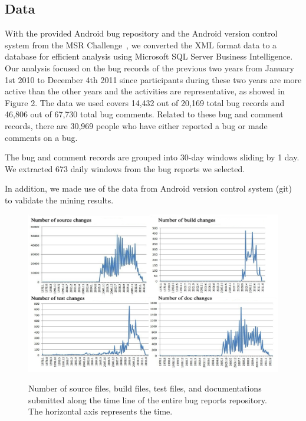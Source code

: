 \documentclass[10pt, conference, compsocconf]{IEEEtran}
\begin{document}
\subsection{Data}

With the provided Android bug repository and the Android version
control system
from the MSR Challenge~\cite{DATA:msr}, we converted the XML format data to
a database for efficient analysis using Microsoft SQL Server Business
Intelligence. Our analysis focused on the bug records of the previous
two years from January 1st 2010 to December 4th 2011 since participants
during these two years are more active than the other years and the
activities are representative, as showed in Figure 2. The data we used
covers 14,432 out of 20,169 total bug records and 46,806 out of 67,730
total bug comments. Related to these bug and comment records, there
are 30,969 people who have either reported a bug or made comments on a
bug.


The bug and comment records are grouped into 30-day windows sliding by
1 day. 
We extracted 673 daily windows  from the bug reports we selected.

In addition, we made use of the data from Android version control
system (git)
to validate the mining results.


\begin{figure}[ht]
\centering
\includegraphics[width=13cm]{2010-2011.png}
\label{2010-2011}
\caption{Number of source files, build files, test files, and documentations submitted along the time line of the entire bug reports repository. The horizontal axis represents the time.}
\end{figure}
\end{document}
